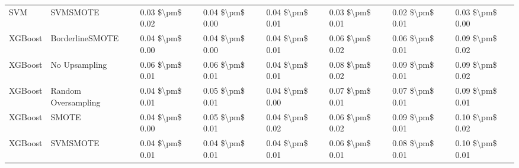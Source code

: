 \begin{tabular}{llllllll}
                            SVM &                      SVMSMOTE & 0.03 \$\textbackslash pm\$ 0.02 &           0.04 \$\textbackslash pm\$ 0.00 &       0.04 \$\textbackslash pm\$ 0.01 &        0.03 \$\textbackslash pm\$ 0.01 &                         0.02 \$\textbackslash pm\$ 0.01 & 0.03 \$\textbackslash pm\$ 0.00 \\
                        XGBoost &               BorderlineSMOTE & 0.04 \$\textbackslash pm\$ 0.00 &           0.04 \$\textbackslash pm\$ 0.00 &       0.04 \$\textbackslash pm\$ 0.01 &        0.06 \$\textbackslash pm\$ 0.02 &                         0.06 \$\textbackslash pm\$ 0.01 & 0.09 \$\textbackslash pm\$ 0.02 \\
                        XGBoost &                 No Upsampling & 0.06 \$\textbackslash pm\$ 0.01 &           0.06 \$\textbackslash pm\$ 0.01 &       0.04 \$\textbackslash pm\$ 0.01 &        0.08 \$\textbackslash pm\$ 0.02 &                         0.09 \$\textbackslash pm\$ 0.01 & 0.09 \$\textbackslash pm\$ 0.02 \\
                        XGBoost &           Random Oversampling & 0.04 \$\textbackslash pm\$ 0.01 &           0.05 \$\textbackslash pm\$ 0.01 &       0.04 \$\textbackslash pm\$ 0.00 &        0.07 \$\textbackslash pm\$ 0.01 &                         0.07 \$\textbackslash pm\$ 0.01 & 0.09 \$\textbackslash pm\$ 0.01 \\
                        XGBoost &                         SMOTE & 0.04 \$\textbackslash pm\$ 0.00 &           0.05 \$\textbackslash pm\$ 0.01 &       0.04 \$\textbackslash pm\$ 0.02 &        0.06 \$\textbackslash pm\$ 0.02 &                         0.09 \$\textbackslash pm\$ 0.01 & 0.10 \$\textbackslash pm\$ 0.02 \\
                        XGBoost &                      SVMSMOTE & 0.04 \$\textbackslash pm\$ 0.01 &           0.04 \$\textbackslash pm\$ 0.01 &       0.04 \$\textbackslash pm\$ 0.01 &        0.06 \$\textbackslash pm\$ 0.01 &                         0.08 \$\textbackslash pm\$ 0.01 & 0.10 \$\textbackslash pm\$ 0.01 \\
\bottomrule
\end{tabular}
